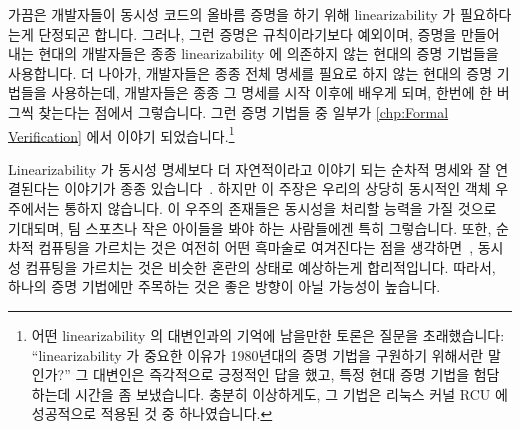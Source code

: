 \fi

가끔은 개발자들이 동시성 코드의 올바름 증명을 하기 위해 linearizability 가
필요하다는게 단정되곤 합니다.
그러나, 그런 증명은 규칙이라기보다 예외이며, 증명을 만들어내는 현대의
개발자들은 종종 linearizability 에 의존하지 않는 현대의 증명 기법들을
사용합니다.
더 나아가, 개발자들은 종종 전체 명세를 필요로 하지 않는 현대의 증명 기법들을
사용하는데, 개발자들은 종종 그 명세를 시작 이후에 배우게 되며, 한번에 한 버그씩
찾는다는 점에서 그렇습니다.
그런 증명 기법들 중 일부가
\cref{chp:Formal Verification} 에서 이야기 되었습니다.\footnote{
	어떤 linearizability 의 대변인과의 기억에 남을만한 토론은 질문을
	초래했습니다:
	``linearizability 가 중요한 이유가 1980년대의 증명 기법을 구원하기
	위해서란 말인가?''
	그 대변인은 즉각적으로 긍정적인 답을 했고, 특정 현대 증명 기법을
	험담하는데 시간을 좀 보냈습니다.
	충분히 이상하게도, 그 기법은 리눅스 커널 RCU 에 성공적으로 적용된 것 중
	하나였습니다.}

\iffalse

It is sometimes asserted that linearizability is necessary for developers
to produce proofs of correctness for their concurrent code.
However, such proofs are the exception rather than the rule, and modern
developers who do produce proofs often use modern proof techniques that
do not depend on linearizability.
Furthermore, developers frequently use modern proof techniques that do
not require a full specification, given that developers often learn
their specification after the fact, one bug at a time.
A few such proof techniques were discussed in
\cref{chp:Formal Verification}.\footnote{
	A memorable verbal discussion with an advocate of linearizability
	resulted in question:
	``So the reason linearizability is important is to rescue 1980s
	proof techniques?''
	The advocate immediately replied in the affirmative, then spent
	some time disparaging a particular modern proof technique.
	Oddly enough, that technique was one of those successfully
	applied to Linux-kernel RCU\@.}

\fi

Linearizability 가 동시성 명세보다 더 자연적이라고 이야기 되는 순차적 명세와
잘 연결된다는 이야기가 종종
있습니다~\cite{SergioRajsbaum2020HistoryLinearizability}.
하지만 이 주장은 우리의 상당히 동시적인 객체 우주에서는 통하지 않습니다.
이 우주의 존재들은 동시성을 처리할 능력을 가질 것으로 기대되며, 팀 스포츠나
작은 아이들을 봐야 하는 사람들에겐 특히 그렇습니다.
또한, 순차적 컴퓨팅을 가르치는 것은 여전히 어떤 흑마술로 여겨진다는 점을
생각하면~\cite{ElizabethPatitsas2020GradesNotBimodal}, 동시성 컴퓨팅을 가르치는
것은 비슷한 혼란의 상태로 예상하는게 합리적입니다.
따라서, 하나의 증명 기법에만 주목하는 것은 좋은 방향이 아닐 가능성이 높습니다.

